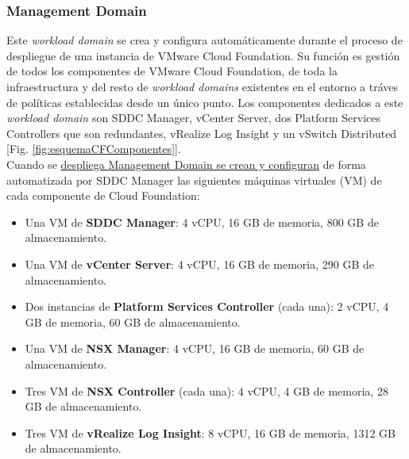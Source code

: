 \subsubsection{Management Domain}
\label{subsubsec:domainManagement}
Este \textit{workload domain} se crea y configura automáticamente durante el proceso de despliegue de una instancia de VMware Cloud Foundation. Su función es gestión de todos los componentes de VMware Cloud Foundation, de toda la infraestructura y del resto de \textit{workload domains} existentes en el entorno a tráves de políticas establecidas desde un único punto. Los componentes dedicados a este \textit{workload domain} son SDDC Manager, vCenter Server, dos Platform Services Controllers que son redundantes, vRealize Log Insight y un vSwitch Distributed [Fig. \ref{fig:esquemaCFComponentes}].\\
Cuando se \underline{despliega Management Domain se crean y configuran} de forma automatizada por SDDC Manager las siguientes máquinas virtuales (VM) de cada componente de Cloud Foundation:
\begin{itemize}
    \item Una VM de \textbf{SDDC Manager}: 4 vCPU, 16 GB de memoria, 800 GB de almacenamiento.
    \item Una VM de \textbf{vCenter Server}: 4 vCPU, 16 GB de memoria, 290 GB de almacenamiento.
    \item Dos instancias de \textbf{Platform Services Controller} (cada una): 2 vCPU, 4 GB de memoria, 60 GB de almacenamiento.
    \item Una VM de \textbf{NSX Manager}: 4 vCPU, 16 GB de memoria, 60 GB de almacenamiento.
    \item Tres VM de \textbf{NSX Controller} (cada una): 4 vCPU, 4 GB de memoria, 28 GB de almacenamiento.
    \item Tres VM de \textbf{vRealize Log Insight}: 8 vCPU, 16 GB de memoria, 1312 GB de almacenamiento.
\end{itemize}


